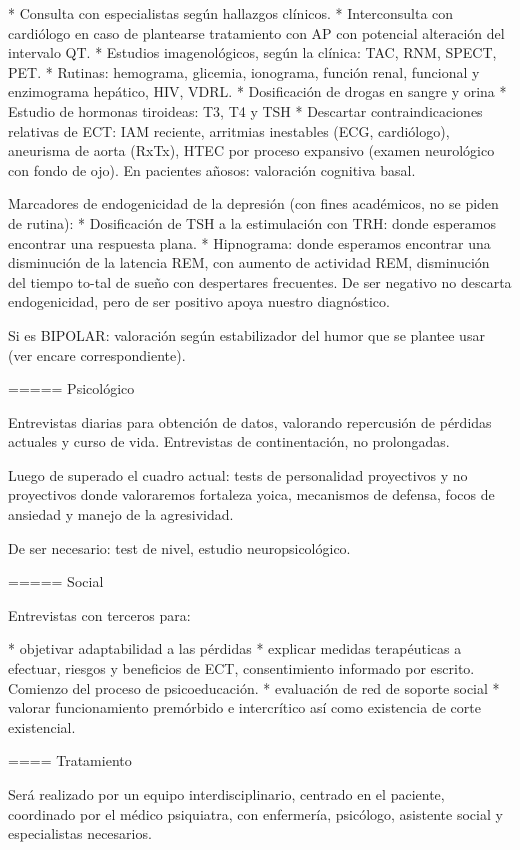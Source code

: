 * Consulta con especialistas según hallazgos clínicos.
* Interconsulta con cardiólogo en caso de plantearse tratamiento con AP con potencial alteración del intervalo QT.
* Estudios imagenológicos, según la clínica: TAC, RNM, SPECT, PET.
* Rutinas: hemograma, glicemia, ionograma, función renal, funcional y enzimograma hepático, HIV, VDRL.
* Dosificación de drogas en sangre y orina
* Estudio de hormonas tiroideas: T3, T4 y TSH
* Descartar contraindicaciones relativas de ECT: IAM reciente, arritmias inestables (ECG, cardiólogo), aneurisma de aorta (RxTx), HTEC por proceso expansivo (examen neurológico con fondo de ojo). En pacientes añosos: valoración cognitiva basal.

Marcadores de endogenicidad de la depresión (con fines académicos, no se piden de rutina):
* Dosificación de TSH a la estimulación con TRH: donde esperamos encontrar una respuesta plana.
* Hipnograma: donde esperamos encontrar una disminución de la latencia REM, con aumento de actividad REM, disminución del tiempo to-tal de sueño con despertares frecuentes. De ser negativo no descarta endogenicidad, pero de ser positivo apoya nuestro diagnóstico.

Si es BIPOLAR: valoración según estabilizador del humor que se plantee usar (ver encare correspondiente).

===== Psicológico

Entrevistas diarias para obtención de datos, valorando repercusión de pérdidas actuales y curso de vida. Entrevistas de continentación, no prolongadas.

Luego de superado el cuadro actual: tests de personalidad proyectivos y no proyectivos donde valoraremos fortaleza yoica, mecanismos de defensa, focos de ansiedad y manejo de la agresividad.

De ser necesario: test de nivel, estudio neuropsicológico.

===== Social

Entrevistas con terceros para:

* objetivar adaptabilidad a las pérdidas
* explicar medidas terapéuticas a efectuar, riesgos y beneficios de ECT, consentimiento informado por escrito. Comienzo del proceso de psicoeducación.
* evaluación de red de soporte social
* valorar funcionamiento premórbido e intercrítico así como existencia de corte existencial.

==== Tratamiento

Será realizado por un equipo interdisciplinario, centrado en el paciente, coordinado por el médico psiquiatra, con enfermería, psicólogo, asistente social y especialistas necesarios.

